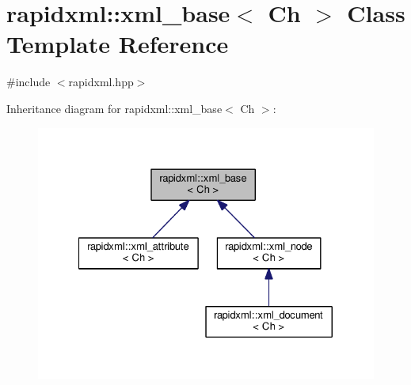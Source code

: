 \hypertarget{classrapidxml_1_1xml__base}{}\section{rapidxml\+:\+:xml\+\_\+base$<$ Ch $>$ Class Template Reference}
\label{classrapidxml_1_1xml__base}


{\ttfamily \#include $<$rapidxml.\+hpp$>$}



Inheritance diagram for rapidxml\+:\+:xml\+\_\+base$<$ Ch $>$\+:\nopagebreak
\begin{figure}[H]
\begin{center}
\leavevmode
\includegraphics[width=327pt]{classrapidxml_1_1xml__base__inherit__graph}
\end{center}
\end{figure}
